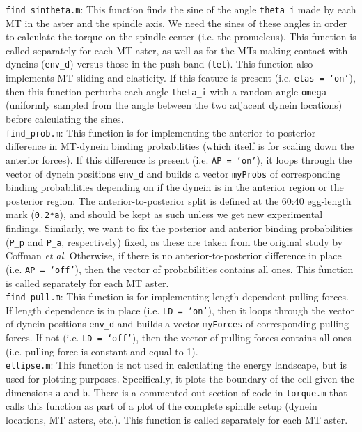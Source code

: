 \documentclass{article}
\begin{document}
\noindent\texttt{find\_sintheta.m}: This function finds the sine of the angle \texttt{theta\_i} made by each MT in the aster and the spindle axis. We need the sines of these angles in order to calculate the torque on the spindle center (i.e. the pronucleus). This function is called separately for each MT aster, as well as for the MTs making contact with dyneins (\texttt{env\_d}) versus those in the push band (\texttt{let}). This function also implements MT sliding and elasticity. If this feature is present (i.e. \texttt{elas = `on'}), then this function perturbs each angle \texttt{theta\_i} with a random angle \texttt{omega} (uniformly sampled from the angle between the two adjacent dynein locations) before calculating the sines.
\\[3pt]

\noindent\texttt{find\_prob.m}: This function is for implementing the anterior-to-posterior difference in MT-dynein binding probabilities (which itself is for scaling down the anterior forces). If this difference is present (i.e. \texttt{AP = `on'}), it loops through the vector of dynein positions \texttt{env\_d} and builds a vector \texttt{myProbs} of corresponding binding probabilities depending on if the dynein is in the anterior region or the posterior region. The anterior-to-posterior split is defined at the 60:40 egg-length mark (\texttt{0.2*a}), and should be kept as such unless we get new experimental findings. Similarly, we want to fix the posterior and anterior binding probabilities (\texttt{P\_p} and \texttt{P\_a}, respectively) fixed, as these are taken from the original study by Coffman \emph{et al}. Otherwise, if there is no anterior-to-posterior difference in place (i.e. \texttt{AP = `off'}), then the vector of probabilities contains all ones. This function is called separately for each MT aster.
\\[3pt]

\noindent\texttt{find\_pull.m}: This function is for implementing length dependent pulling forces. If length dependence is in place (i.e. \texttt{LD = `on'}), then it loops through the vector of dynein positions \texttt{env\_d} and builds a vector \texttt{myForces} of corresponding pulling forces. If not (i.e. \texttt{LD = `off'}), then the vector of pulling forces contains all ones (i.e. pulling force is constant and equal to 1).
\\[3pt]

\noindent\texttt{ellipse.m}: This function is not used in calculating the energy landscape, but is used for plotting purposes. Specifically, it plots the boundary of the cell given the dimensions \texttt{a} and \texttt{b}. There is a commented out section of code in \texttt{torque.m} that calls this function as part of a plot of the complete spindle setup (dynein locations, MT asters, etc.). This function is called separately for each MT aster.
\\[3pt]
\end{document}
